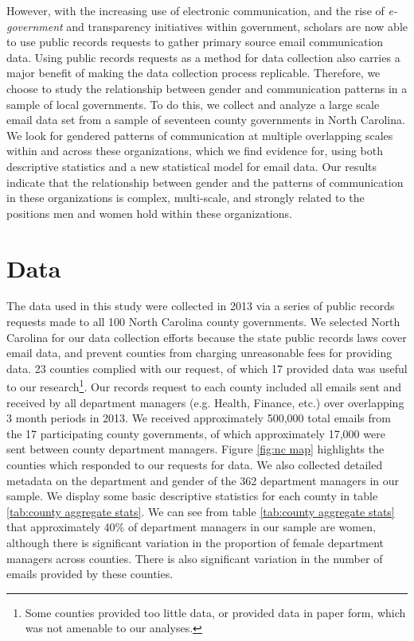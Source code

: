 \documentclass{pnastwo}
\begin{document}
\begin{article}
However, with the increasing use of electronic communication, and the rise of \emph{e-government} and transparency initiatives within government, scholars are now able to use public records requests to gather primary source email communication data. Using public records requests as a method for data collection also carries a major benefit of making the data collection process replicable. Therefore, we choose to study the relationship between gender and communication patterns in a sample of local governments. To do this, we collect and analyze a large scale email data set from a sample of seventeen county governments in North Carolina. We look for gendered patterns of communication at multiple overlapping scales within and across these organizations, which we find evidence for, using both descriptive statistics and a new statistical model for email data. Our results indicate that the relationship between gender and the patterns of communication in these organizations is complex, multi-scale, and strongly related to the positions men and women hold within these organizations.


\section{Data}

The data used in this study were collected in 2013 via a series of public records requests made to all 100 North Carolina county governments. We selected North Carolina for our data collection efforts because the state public records laws cover email data, and prevent counties from charging unreasonable fees for providing data. 23 counties complied with our request, of which 17 provided data was useful to our research\footnote{Some counties provided too little data, or provided data in paper form, which was not amenable to our analyses.}. Our records request to each county included all emails sent and received by all department managers (e.g. Health, Finance, etc.) over overlapping 3 month periods in 2013. We received approximately 500,000 total emails from the 17 participating county governments, of which approximately 17,000 were sent between county department managers. Figure \ref{fig:nc map} highlights the counties which responded to our requests for data. We also collected detailed metadata on the department and gender of the 362 department managers in our sample. We display some basic descriptive statistics for each county in table \ref{tab:county aggregate stats}. We can see from table \ref{tab:county aggregate stats} that approximately 40\% of department managers in our sample are women, although there is significant variation in the proportion of female department managers across counties. There is also significant variation in the number of emails provided by these counties. 



\end{article}
\end{document}
